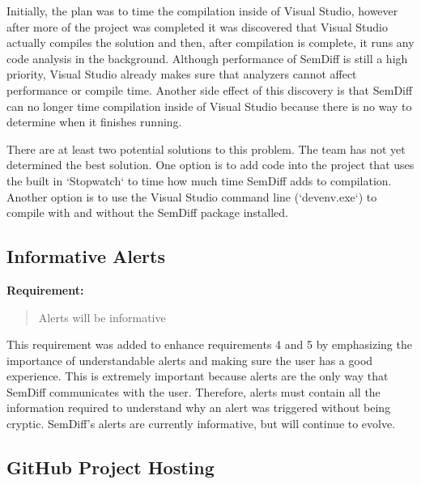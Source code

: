 \documentclass[draftclsnofoot,onecolumn]{IEEEtran}
\begin{document}
Initially, the plan was to time the compilation inside of Visual Studio, 
however after more of the project was completed it was discovered that Visual 
Studio actually compiles the solution and then, after compilation is 
complete, it runs any code analysis in the background. Although performance 
of SemDiff is still a high priority, Visual Studio already makes sure that 
analyzers cannot affect performance or compile time. Another side effect of 
this discovery is that SemDiff can no longer time compilation inside of 
Visual Studio because there is no way to determine when it finishes running.
 
There are at least two potential solutions to this problem. The team has not 
yet determined the best solution. One option is to add code into the project 
that uses the built in `Stopwatch` to time how much time SemDiff adds to 
compilation. Another option is to use the Visual Studio command line 
(`devenv.exe`) to compile with and without the SemDiff package installed.

\subsection{Informative Alerts}%

\textbf{Requirement:}

\begin{quote}

Alerts will be informative

\end{quote}

This requirement was added to enhance requirements 4 and 5 by emphasizing the 
importance of understandable alerts and making sure the user has a good 
experience. This is extremely important because alerts are the only way that 
SemDiff communicates with the user. Therefore, alerts must contain all the 
information required to understand why an alert was triggered without being 
cryptic. SemDiff’s alerts are currently informative, but will continue to 
evolve.

\subsection{GitHub Project Hosting}%
\end{document}
